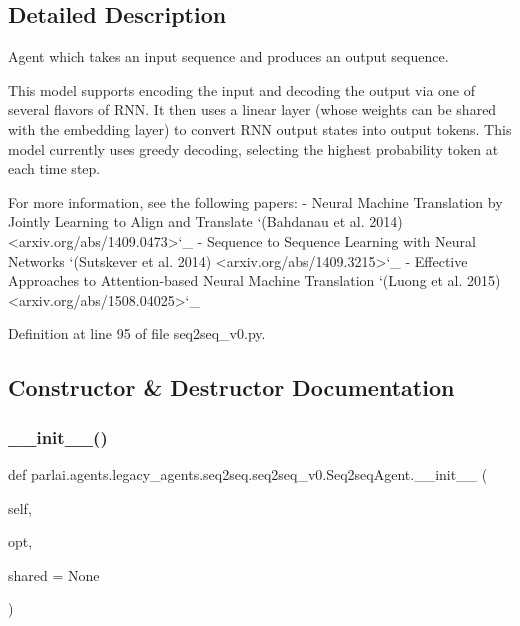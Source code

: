 \subsection{Detailed Description}
\begin{DoxyVerb}Agent which takes an input sequence and produces an output sequence.

This model supports encoding the input and decoding the output via one of
several flavors of RNN. It then uses a linear layer (whose weights can
be shared with the embedding layer) to convert RNN output states into
output tokens. This model currently uses greedy decoding, selecting the
highest probability token at each time step.

For more information, see the following papers:
- Neural Machine Translation by Jointly Learning to Align and Translate
  `(Bahdanau et al. 2014) <arxiv.org/abs/1409.0473>`_
- Sequence to Sequence Learning with Neural Networks
  `(Sutskever et al. 2014) <arxiv.org/abs/1409.3215>`_
- Effective Approaches to Attention-based Neural Machine Translation
  `(Luong et al. 2015) <arxiv.org/abs/1508.04025>`_
\end{DoxyVerb}
 

Definition at line 95 of file seq2seq\+\_\+v0.\+py.



\subsection{Constructor \& Destructor Documentation}
\mbox{\label{classparlai_1_1agents_1_1legacy__agents_1_1seq2seq_1_1seq2seq__v0_1_1Seq2seqAgent_a88801410eefdb0b71bb674a0768e87b9}} 
\subsubsection{\texorpdfstring{\+\_\+\+\_\+init\+\_\+\+\_\+()}{\_\_init\_\_()}}
{\footnotesize\ttfamily def parlai.\+agents.\+legacy\+\_\+agents.\+seq2seq.\+seq2seq\+\_\+v0.\+Seq2seq\+Agent.\+\_\+\+\_\+init\+\_\+\+\_\+ (\begin{DoxyParamCaption}\item[{}]{self,  }\item[{}]{opt,  }\item[{}]{shared = {\ttfamily None} }\end{DoxyParamCaption})}

